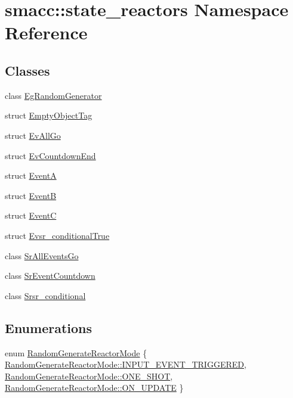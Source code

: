 \hypertarget{namespacesmacc_1_1state__reactors}{}\section{smacc\+:\+:state\+\_\+reactors Namespace Reference}
\label{namespacesmacc_1_1state__reactors}
\subsection*{Classes}
\begin{DoxyCompactItemize}
\item 
class \hyperlink{classsmacc_1_1state__reactors_1_1EgRandomGenerator}{Eg\+Random\+Generator}
\item 
struct \hyperlink{structsmacc_1_1state__reactors_1_1EmptyObjectTag}{Empty\+Object\+Tag}
\item 
struct \hyperlink{structsmacc_1_1state__reactors_1_1EvAllGo}{Ev\+All\+Go}
\item 
struct \hyperlink{structsmacc_1_1state__reactors_1_1EvCountdownEnd}{Ev\+Countdown\+End}
\item 
struct \hyperlink{structsmacc_1_1state__reactors_1_1EventA}{EventA}
\item 
struct \hyperlink{structsmacc_1_1state__reactors_1_1EventB}{EventB}
\item 
struct \hyperlink{structsmacc_1_1state__reactors_1_1EventC}{EventC}
\item 
struct \hyperlink{structsmacc_1_1state__reactors_1_1Evsr__conditionalTrue}{Evsr\+\_\+conditional\+True}
\item 
class \hyperlink{classsmacc_1_1state__reactors_1_1SrAllEventsGo}{Sr\+All\+Events\+Go}
\item 
class \hyperlink{classsmacc_1_1state__reactors_1_1SrEventCountdown}{Sr\+Event\+Countdown}
\item 
class \hyperlink{classsmacc_1_1state__reactors_1_1Srsr__conditional}{Srsr\+\_\+conditional}
\end{DoxyCompactItemize}
\subsection*{Enumerations}
\begin{DoxyCompactItemize}
\item 
enum \hyperlink{namespacesmacc_1_1state__reactors_a038f8e362ad6d35494c940ee4c97a52e}{Random\+Generate\+Reactor\+Mode} \{ \hyperlink{namespacesmacc_1_1state__reactors_a038f8e362ad6d35494c940ee4c97a52eab75323a08fc093fa69e7a6aceb681611}{Random\+Generate\+Reactor\+Mode\+::\+I\+N\+P\+U\+T\+\_\+\+E\+V\+E\+N\+T\+\_\+\+T\+R\+I\+G\+G\+E\+R\+ED}, 
\hyperlink{namespacesmacc_1_1state__reactors_a038f8e362ad6d35494c940ee4c97a52ea5bc2964599423c796ecf0aaecdc5be9d}{Random\+Generate\+Reactor\+Mode\+::\+O\+N\+E\+\_\+\+S\+H\+OT}, 
\hyperlink{namespacesmacc_1_1state__reactors_a038f8e362ad6d35494c940ee4c97a52ea4a6be4c8602d150038b100a35556d3d7}{Random\+Generate\+Reactor\+Mode\+::\+O\+N\+\_\+\+U\+P\+D\+A\+TE}
 \}
\end{DoxyCompactItemize}


